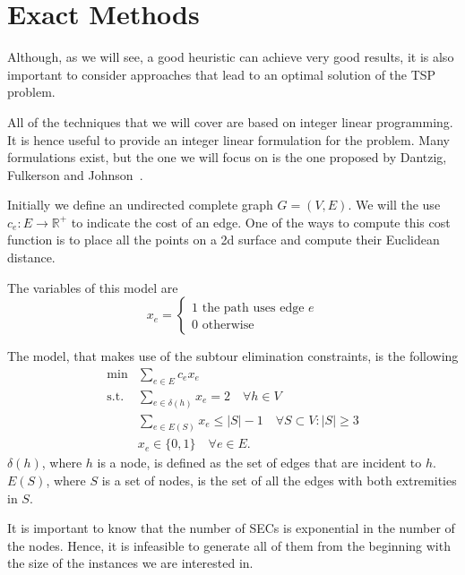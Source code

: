 \documentclass{article}
\begin{document}
\clearpage

\section{Exact Methods}
Although, as we will see, a good heuristic can achieve very good results, it is also
important to consider approaches that lead to an optimal solution of the
TSP problem.

All of the techniques that we will cover are based on integer linear programming. It is
hence useful to provide an integer linear formulation for the problem.
Many formulations exist, but the one we will focus on is the one proposed by
Dantzig, Fulkerson and Johnson~\cite{dantzig1954solution}.

Initially we define an undirected complete graph $G=(V, E)$.
We will the use $c_e : E \rightarrow \mathbb{R}^+$ to indicate the cost of
an edge.
One of the ways to compute this cost function is to place all the points
on a 2d surface and compute their Euclidean distance.

The variables of this model are
\begin{equation*}
        x_e =
        \left\{
                \begin{array}{l}
                1 \text{ the path uses edge $e$}\\
                0 \text{ otherwise }
        \end{array}
        \right.
\end{equation*}

The model, that makes use of the subtour elimination constraints, is the
following
\begin{equation}
  \begin{aligned}
\min & \sum_{e \in E} c_e x_e \\
\text{s.t.}
& \sum_{e \in \delta(h)} x_{e} = 2 \quad \forall h \in V \\
& \sum_{e \in E(S)} x_{e} \leq |S| - 1 \quad \forall S \subset V : |S| \geq 3 \\
& x_{e} \in \{0, 1\} \quad \forall e \in E.
\end{aligned}
\end{equation}
$\delta(h)$, where $h$ is a node, is defined as the set of edges that are
incident to $h$. $E(S)$, where $S$ is a set of nodes, is the set of all
the edges with both extremities in $S$.

It is important to know that the number of SECs is exponential in the number of
the nodes. Hence, it is infeasible to generate all of them from the beginning
with the size of the instances we are interested in.
\end{document}
